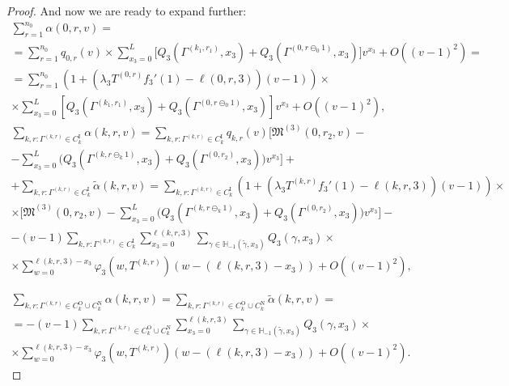 \documentclass[runningheads,a4paper]{llncs}
\begin{document}
\begin{proof}
And now we are ready to expand further:
\begin{multline*}
    \sum_{r=1}^{n_0} \alpha (0,r,v) = \\
    =\sum_{r=1}^{n_0} q_{0,r}(v) \times \sum_{x_3=0}^{L} \bigl[ Q_3(\Gamma^{(k_1,r_1)},x_3) + Q_3(\Gamma^{(0,r\ominus_0 1)},x_3) \bigr] v^{x_3} + O((v-1)^2) =\\
    = \sum_{r=1}^{n_0}(1 + (\lambda_3 T^{(0,r)} f_3'(1) - \ell(0,r,3))(v-1))  \times  \\
    \times \sum_{x_3=0}^{L} \left[ Q_3(\Gamma^{(k_1,r_1)},x_3) + Q_3(\Gamma^{(0,r\ominus_0 1)},x_3) \right] v^{x_3} + O((v-1)^2),
\end{multline*}
\begin{multline*}
    \sum_{k,r\colon \Gamma^{(k, r)} \in C_{k}^{\mathrm{I}}} \alpha(k,r,v) =  \sum_{k,r\colon \Gamma^{(k, r)} \in C_{k}^{\mathrm{I}}}q_{k,r}(v) \biggl[ \mathfrak{M}^{(3)}(0,r_2,v) - \\ -   \sum_{x_3=0}^L\bigl(Q_3(\Gamma^{(k,r\ominus_{k} 1)},x_3) + Q_3(\Gamma^{(0,r_2)},x_3) \bigr) v^{x_3} \biggr] + \\ 
    + \sum_{k,r\colon \Gamma^{(k, r)} \in C_{k}^{\mathrm{I}}} \tilde{\alpha}(k,r,v)
    = \sum_{k,r\colon \Gamma^{(k, r)} \in C_{k}^{\mathrm{I}}}(1 + (\lambda_3 T^{(k,r)} f_3'(1) - \ell(k,r,3))(v-1) )\times \\ 
     \times \biggl[ \mathfrak{M}^{(3)}(0,r_2,v) -   \sum_{x_3=0}^L\bigl(Q_3(\Gamma^{(k,r\ominus_{k} 1)},x_3) + Q_3(\Gamma^{(0,r_2)},x_3) \bigr) v^{x_3} \biggr] -\\- (v-1)\sum_{k,r\colon \Gamma^{(k, r)} \in C_{k}^{\mathrm{I}}} \sum_{x_3=0}^{\ell(k,r,3)}\sum_{\gamma \in {\mathbb H}_{-1}(\tilde{\gamma},x_3)} Q_3(\gamma,x_3) \times \\
     \times \sum_{w=0}^{\ell(k,r,3) - x_3} \varphi_3(w,T^{(k,r)}) (w-(\ell(k,r,3)-x_3)) + O((v-1)^2),
 \end{multline*}

\begin{multline*}
    \sum_{k,r\colon \Gamma^{(k, r)} \in C_{k}^{\mathrm{O}}\cup C_{k}^{\mathrm{N}}} \alpha(k,r,v) =  \sum_{k,r\colon \Gamma^{(k, r)} \in C_{k}^{\mathrm{O}}\cup C_{k}^{\mathrm{N}}} \tilde{\alpha}(k,r,v) = \\=
    -(v-1)\sum_{k,r\colon \Gamma^{(k, r)} \in C_{k}^{\mathrm{O}}\cup C_{k}^{\mathrm{N}}} \sum_{x_3=0}^{\ell(k,r,3)}\sum_{\gamma \in {\mathbb H}_{-1}(\tilde{\gamma},x_3)} Q_3(\gamma,x_3) \times \\
    \times \sum_{w=0}^{\ell(k,r,3) - x_3} \varphi_3(w,T^{(k,r)}) (w-(\ell(k,r,3)-x_3))  +O((v-1)^2).
\end{multline*}


\end{proof}
\end{document}
